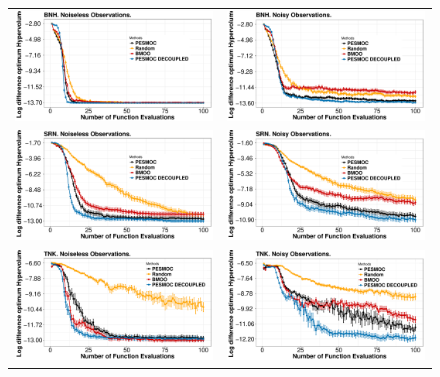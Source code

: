 \documentclass[review,preprint,12pt]{elsarticle}
\begin{document}
\begin{figure}[H]
	\begin{tabular}{cc}
        	\vspace{-.2cm}
	        \includegraphics[width=0.475\linewidth]{figures/benchmark/BNH.pdf} &
	        \includegraphics[width=0.475\linewidth]{figures/benchmark/BNH_noisy.pdf} \\
		\includegraphics[width=0.475\linewidth]{figures/benchmark/SRN.pdf} &
                \includegraphics[width=0.475\linewidth]{figures/benchmark/SRN_noisy.pdf} \\
		\includegraphics[width=0.475\linewidth]{figures/benchmark/TNK.pdf} &
                \includegraphics[width=0.475\linewidth]{figures/benchmark/TNK_noisy.pdf} \\

\end{tabular}
\end{figure}
\end{document}
